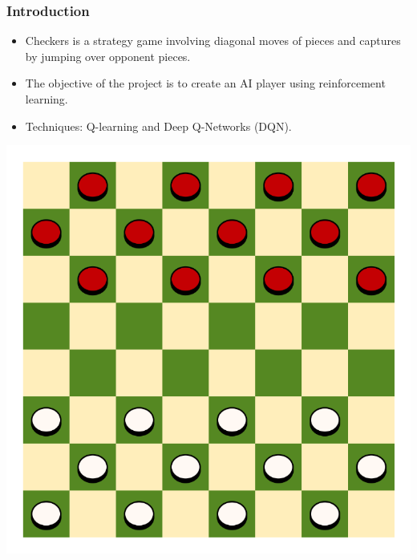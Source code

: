 \begin{frame}
	\frametitle{Introduction}
	\vspace{0.5cm}
	\begin{itemize}
		\item Checkers is a strategy game involving diagonal moves of pieces and captures by jumping over opponent pieces.
		\item The objective of the project is to create an AI player using reinforcement learning.
		\item Techniques: Q-learning and Deep Q-Networks (DQN).
	\end{itemize}
	\centering
	\includegraphics[scale=0.25]{checkers}
\end{frame}


